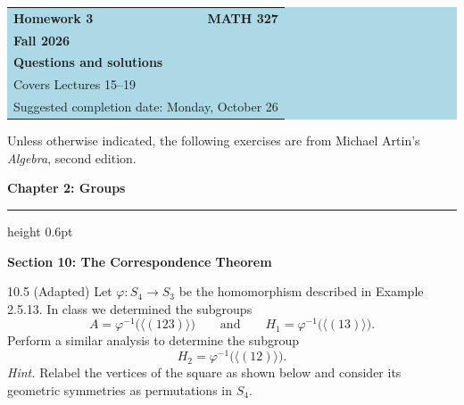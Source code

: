 \documentclass[11pt]{article}
\newcommand{\chapterheading}[1]{%
  \par\vspace{0.5em}
  {\color{courseblue}\Large\bfseries #1}\par\vspace{0.35em}
  {\color{boxborder}\hrule height 0.6pt}\vspace{0.35em}
}
\newcommand{\sectionheading}[1]{%
  \Needspace{8\baselineskip}
  \vspace{0.25em}
  {\color{darkgray}\large\bfseries #1}\par
}
\begin{document}
\begin{center}
  \colorbox{lightblue}{%
    \begin{minipage}{0.92\textwidth}
      \vspace{0.6em}
      \begin{tabular*}{\textwidth}{@{\extracolsep{\fill}}lr}
        {\color{courseblue}\bfseries\LARGE Homework 3} &
        {\color{courseblue}\bfseries\LARGE MATH 327}\\[0.4em]
        \multicolumn{2}{l}{\color{darkgray}\bfseries Fall 2026}\\[0.35em]
        \multicolumn{2}{l}{\color{courseblue}\bfseries Questions and solutions}\\[0.35em]
        \multicolumn{2}{l}{\color{darkgray}Covers Lectures 15--19}\\[0.2em]
        \multicolumn{2}{l}{\color{darkgray}Suggested completion date: Monday, October 26}
      \end{tabular*}
      \vspace{0.5em}
    \end{minipage}}
\end{center}

\vspace{0.5em}

Unless otherwise indicated, the following exercises are from Michael Artin's
\emph{Algebra}, second edition.

\chapterheading{Chapter 2: Groups}

\sectionheading{Section 10: The Correspondence Theorem}

\begin{exercise}{10.5 (Adapted)}
Let $\varphi\colon S_4\to S_3$ be the homomorphism described in
Example 2.5.13. In class we determined the subgroups
\[
  A=\varphi^{-1}\bigl(\langle(123)\rangle\bigr)
  \qquad\text{and}\qquad
  H_1=\varphi^{-1}\bigl(\langle(13)\rangle\bigr).
\]
Perform a similar analysis to determine the subgroup
\[
  H_2=\varphi^{-1}\bigl(\langle(12)\rangle\bigr).
\]
\textit{Hint.} Relabel the vertices of the square as shown below and
consider its geometric symmetries as permutations in $S_4$.
\begin{center}
\end{center}
\end{exercise}
\end{document}
